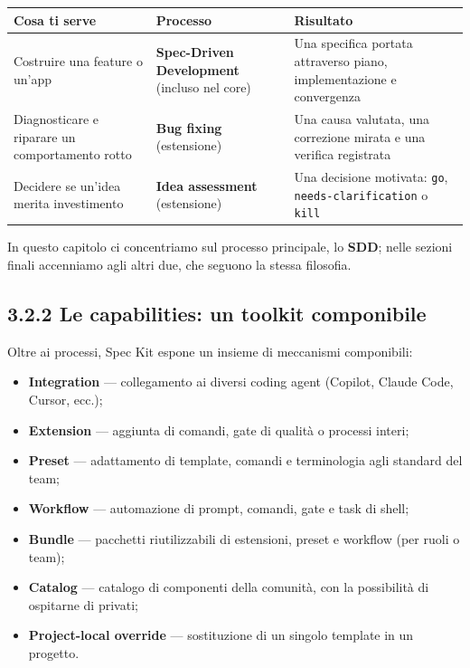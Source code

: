 \documentclass[
  italian,
  10pt,
]{book}
\newcounter{none} %
\providecommand{\tightlist}{%
  \setlength{\itemsep}{0pt}\setlength{\parskip}{0pt}}
\begin{document}
{\def\LTcaptype{none} %
\begin{longtable}[]{@{}
  >{\raggedright\arraybackslash}p{}
  >{\raggedright\arraybackslash}p{}
  >{\raggedright\arraybackslash}p{}@{}}
\toprule\noalign{}
\begin{minipage}[b]{\linewidth}\raggedright
Cosa ti serve
\end{minipage} & \begin{minipage}[b]{\linewidth}\raggedright
Processo
\end{minipage} & \begin{minipage}[b]{\linewidth}\raggedright
Risultato
\end{minipage} \\
\midrule\noalign{}
\endhead
\bottomrule\noalign{}
\endlastfoot
Costruire una feature o un'app & \textbf{Spec-Driven Development}
(incluso nel core) & Una specifica portata attraverso piano,
implementazione e convergenza \\
Diagnosticare e riparare un comportamento rotto & \textbf{Bug fixing}
(estensione) & Una causa valutata, una correzione mirata e una verifica
registrata \\
Decidere se un'idea merita investimento & \textbf{Idea assessment}
(estensione) & Una decisione motivata: \texttt{go},
\texttt{needs-clarification} o \texttt{kill} \\
\end{longtable}
}

In questo capitolo ci concentriamo sul processo principale, lo
\textbf{SDD}; nelle sezioni finali accenniamo agli altri due, che
seguono la stessa filosofia.

\subsection{3.2.2 Le capabilities: un toolkit
componibile}\label{le-capabilities-un-toolkit-componibile}

Oltre ai processi, Spec Kit espone un insieme di meccanismi componibili:

\begin{itemize}
\tightlist
\item
  \textbf{Integration} --- collegamento ai diversi coding agent
  (Copilot, Claude Code, Cursor, ecc.);
\item
  \textbf{Extension} --- aggiunta di comandi, gate di qualità o processi
  interi;
\item
  \textbf{Preset} --- adattamento di template, comandi e terminologia
  agli standard del team;
\item
  \textbf{Workflow} --- automazione di prompt, comandi, gate e task di
  shell;
\item
  \textbf{Bundle} --- pacchetti riutilizzabili di estensioni, preset e
  workflow (per ruoli o team);
\item
  \textbf{Catalog} --- catalogo di componenti della comunità, con la
  possibilità di ospitarne di privati;
\item
  \textbf{Project-local override} --- sostituzione di un singolo
  template in un progetto.
\end{itemize}
\end{document}

